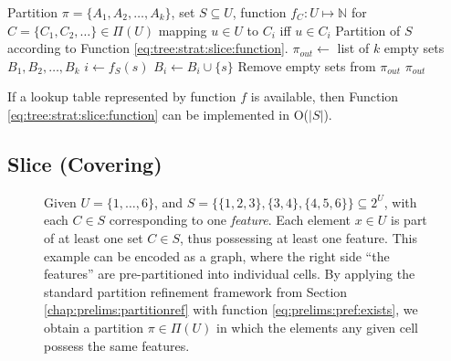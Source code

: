 			\begin{algorithm}[ht!]
				\centering
				\begin{algorithmic}
					\Require Partition $\pi = \{ A_1, A_2, \ldots, A_k \}$, set $S \subseteq U$, function $f_C: U \mapsto \mathbb{N}$ for $C = \{ C_1, C_2, \ldots \} \in \Pi(U)$ mapping $u \in U$ to $C_i$ iff $u \in C_i$
					\Ensure Partition of $S$ according to Function \ref{eq:tree:strat:slice:function}.
					\Statex
						\State $\pi_{out} \gets$ list of $k$ empty sets $B_1, B_2, \ldots, B_k$
							\State $i \gets f_S(s)$
							\State $B_i \gets B_i \cup \{ s \}$
						\EndFor
						\State Remove empty sets from $\pi_{out}$
						\State \Return $\pi_{out}$
					\EndFunction
				\end{algorithmic}
				\caption{If a lookup table represented by function $f$ is available, then Function \ref{eq:tree:strat:slice:function} can be implemented in O($|S|$).}
				\label{algo:tree:strat:slice}
			\end{algorithm}

			\FloatBarrier
			\clearpage

		\subsection{Slice (Covering)}

			\begin{figure}[ht!]
				\centering
				
				\caption{Given $U = \{ 1, \ldots, 6 \}$, and $S = \{ \{ 1, 2, 3 \}, \{ 3, 4 \}, \{ 4, 5, 6 \} \} \subseteq 2^U$, with each $C \in S$ corresponding to one \textit{feature}.
				Each element $x \in U$ is part of at least one set $C \in S$, thus possessing at least one feature.
				This example can be encoded as a graph, where the right side \enquote{the features} are pre-partitioned into individual cells. By applying the standard partition refinement framework from Section \ref{chap:prelims:partitionref} with function \ref{eq:prelims:pref:exists}, we obtain a partition $\pi \in \Pi(U)$ in which the elements any given cell possess the same features.}
				\label{fig:tree:strat:cov}
			\end{figure}

